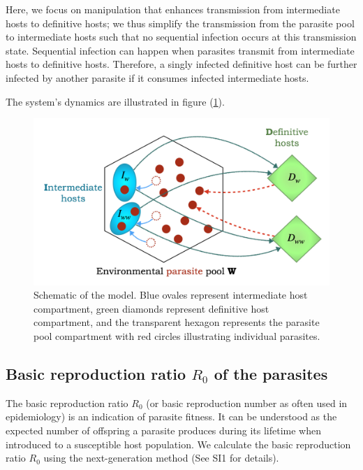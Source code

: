 \documentclass[11pt]{article}
\begin{document}
Here, we focus on manipulation that enhances transmission from intermediate hosts to definitive hosts; we thus simplify the transmission from the parasite pool to intermediate hosts such that no sequential infection occurs at this transmission state. 
Sequential infection can happen when parasites transmit from intermediate hosts to definitive hosts. 
Therefore, a singly infected definitive host can be further infected by another parasite if it consumes infected intermediate hosts. 

The system's dynamics are illustrated in figure (\ref{fig:schematic}).
%
\begin{figure}[ht!]
\centering
\includegraphics[width=\textwidth]{Figures/schematic.jpeg}
\caption{Schematic of the model. Blue ovales represent intermediate host compartment, 
green diamonds represent definitive host compartment, 
and the transparent hexagon represents the parasite pool compartment with red circles illustrating individual parasites.
}
\label{fig:schematic}
\end{figure}

\subsection*{Basic reproduction ratio $R_0$ of the parasites}

The basic reproduction ratio $R_0$ (or basic reproduction number as often used in epidemiology) is an indication of parasite fitness. 
It can be understood as the expected number of offspring a parasite produces during its lifetime when introduced to a susceptible host population. 
We calculate the basic reproduction ratio $R_0$ using the next-generation method \citep{Diekmann1990, Diekmann2009, hurford:JRSI:2010} (See SI1 for details).
\end{document}
